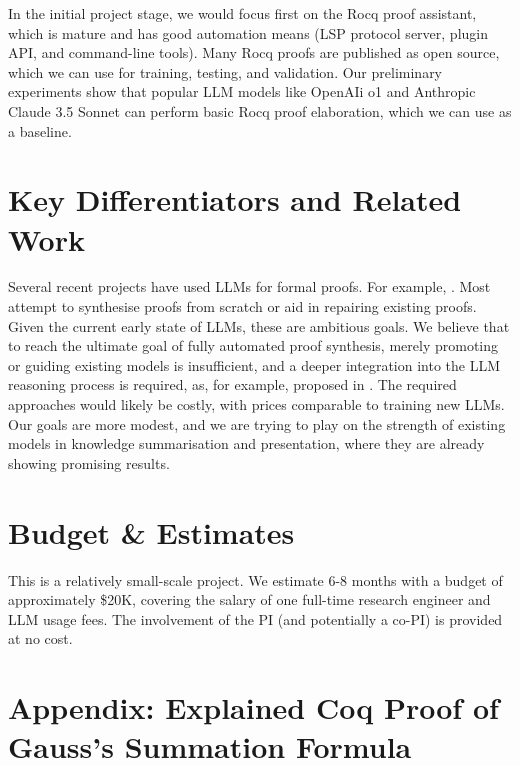 \documentclass[letterpaper]{article}
\begin{document}
In the initial project stage, we would focus first on the Rocq proof
assistant, which is mature and has good automation means (LSP protocol
server, plugin API, and command-line tools). Many Rocq proofs are
published as open source, which we can use for training, testing, and
validation. Our preliminary experiments show that popular LLM models
like OpenAIi o1 and Anthropic Claude 3.5 Sonnet can perform basic Rocq
proof elaboration, which we can use as a baseline.

\section*{Key Differentiators and Related Work}

Several recent projects have used LLMs for formal proofs. For example,
\cite{DBLP:journals/corr/abs-2409-14274,
  DBLP:journals/corr/abs-2205-12615,
  DBLP:journals/corr/abs-1905-09381,DBLP:journals/corr/abs-2410-19605,
  DBLP:journals/corr/abs-2306-15626,
  DBLP:journals/corr/abs-2407-03203}.  Most attempt to synthesise
proofs from scratch or aid in repairing existing proofs. Given the
current early state of LLMs, these are ambitious goals. We believe
that to reach the ultimate goal of fully automated proof synthesis,
merely promoting or guiding existing models is insufficient, and a
deeper integration into the LLM reasoning process is required, as, for
example, proposed in \cite{park2024grammaraligneddecoding}. The
required approaches would likely be costly, with prices comparable to
training new LLMs. Our goals are more modest, and we are trying to
play on the strength of existing models in knowledge summarisation and
presentation, where they are already showing promising results.

\section*{Budget \& Estimates}

This is a relatively small-scale project. We estimate 6-8 months with
a budget of approximately \$20K, covering the salary of one full-time
research engineer and LLM usage fees. The involvement of the PI (and
potentially a co-PI) is provided at no cost.

\appendix

\pagebreak
\section{Appendix: Explained Coq Proof of Gauss's Summation Formula}
\label{sec:explained}
\end{document}

